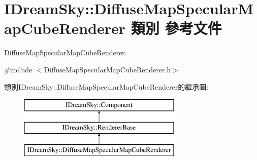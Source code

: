 \hypertarget{class_i_dream_sky_1_1_diffuse_map_specular_map_cube_renderer}{}\section{I\+Dream\+Sky\+:\+:Diffuse\+Map\+Specular\+Map\+Cube\+Renderer 類別 參考文件}
\label{class_i_dream_sky_1_1_diffuse_map_specular_map_cube_renderer}


\hyperlink{class_i_dream_sky_1_1_diffuse_map_specular_map_cube_renderer}{Diffuse\+Map\+Specular\+Map\+Cube\+Renderer}.  




{\ttfamily \#include $<$Diffuse\+Map\+Specular\+Map\+Cube\+Renderer.\+h$>$}

類別\+I\+Dream\+Sky\+:\+:Diffuse\+Map\+Specular\+Map\+Cube\+Renderer的繼承圖\+:\begin{figure}[H]
\begin{center}
\leavevmode
\includegraphics[height=3.000000cm]{class_i_dream_sky_1_1_diffuse_map_specular_map_cube_renderer}
\end{center}
\end{figure}
